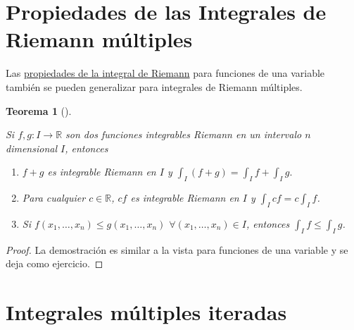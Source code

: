 \documentclass[
  a4paper,
]{scrreport}
\theoremstyle{definition}
\theoremstyle{definition}
\theoremstyle{definition}
\theoremstyle{plain}
\newtheorem{theorem}{Teorema}[chapter]
\theoremstyle{plain}
\theoremstyle{plain}
\theoremstyle{remark}
\begin{document}
\section{Propiedades de las Integrales de Riemann
múltiples}\label{propiedades-de-las-integrales-de-riemann-muxfaltiples}

Las
\href{http://localhost:1313/08-integrales.html\#propiedades-de-la-integral-de-riemann}{propiedades
de la integral de Riemann} para funciones de una variable también se
pueden generalizar para integrales de Riemann múltiples.

\begin{theorem}[]\protect\hypertarget{thm-propiedades-integrales-Riemann-multiples}{}\label{thm-propiedades-integrales-Riemann-multiples}

Si \(f,g:I\to\mathbb{R}\) son dos funciones integrables Riemann en un
intervalo \(n\) dimensional \(I\), entonces

\begin{enumerate}
\def\labelenumi{\alph{enumi}.}
\item
  \(f+g\) es integrable Riemann en \(I\) y
  \(\int_I (f+g) = \int_I f + \int_I g.\)
\item
  Para cualquier \(c\in\mathbb{R}\), \(cf\) es integrable Riemann en
  \(I\) y \(\int_I cf = c\int_I f\).
\item
  Si \(f(x_1,\ldots,x_n) \leq g(x_1,\ldots,x_n)\)
  \(\forall (x_1,\ldots,x_n)\in I\), entonces
  \(\int_I f \leq \int_I g\).
\end{enumerate}

\end{theorem}

\begin{tcolorbox}[enhanced jigsaw, bottomtitle=1mm, title=\textcolor{quarto-callout-note-color}{\faInfo}\hspace{0.5em}{Demostración}, colbacktitle=quarto-callout-note-color!10!white, coltitle=black, leftrule=.75mm, colback=white, toptitle=1mm, toprule=.15mm, titlerule=0mm, opacitybacktitle=0.6, colframe=quarto-callout-note-color-frame, bottomrule=.15mm, arc=.35mm, rightrule=.15mm, breakable, left=2mm, opacityback=0]

\begin{proof}
La demostración es similar a la vista para funciones de una variable y
se deja como ejercicio.
\end{proof}

\end{tcolorbox}

\section{Integrales múltiples
iteradas}\label{integrales-muxfaltiples-iteradas}
\end{document}
